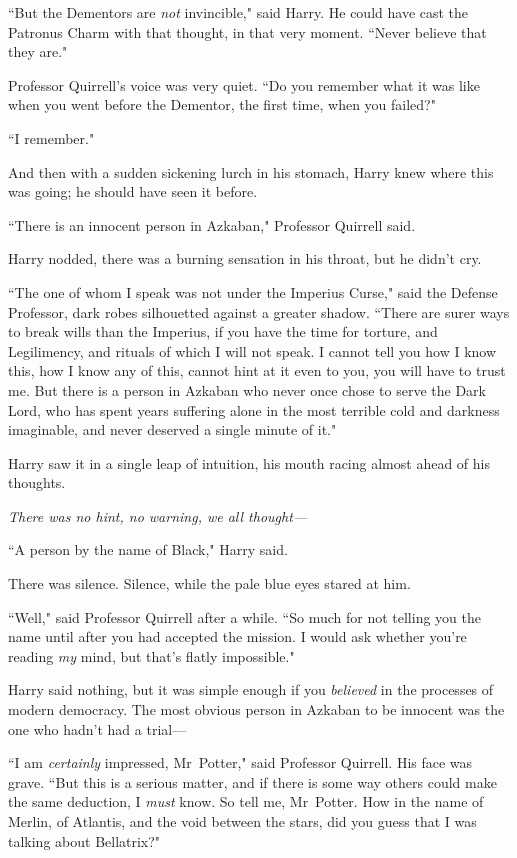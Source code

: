 ``But the Dementors are \emph{not} invincible," said Harry. He could have cast the Patronus Charm with that thought, in that very moment. ``Never believe that they are."

Professor Quirrell's voice was very quiet. ``Do you remember what it was like when you went before the Dementor, the first time, when you failed?"

``I remember."

And then with a sudden sickening lurch in his stomach, Harry knew where this was going; he should have seen it before.

``There is an innocent person in Azkaban," Professor Quirrell said.

Harry nodded, there was a burning sensation in his throat, but he didn't cry.

``The one of whom I speak was not under the Imperius Curse," said the Defense Professor, dark robes silhouetted against a greater shadow. ``There are surer ways to break wills than the Imperius, if you have the time for torture, and Legilimency, and rituals of which I will not speak. I cannot tell you how I know this, how I know any of this, cannot hint at it even to you, you will have to trust me. But there is a person in Azkaban who never once chose to serve the Dark Lord, who has spent years suffering alone in the most terrible cold and darkness imaginable, and never deserved a single minute of it."

Harry saw it in a single leap of intuition, his mouth racing almost ahead of his thoughts.

\emph{There was no hint, no warning, we all thought—}

``A person by the name of Black," Harry said.

There was silence. Silence, while the pale blue eyes stared at him.

``Well," said Professor Quirrell after a while. ``So much for not telling you the name until after you had accepted the mission. I would ask whether you're reading \emph{my} mind, but that's flatly impossible."

Harry said nothing, but it was simple enough if you \emph{believed} in the processes of modern democracy. The most obvious person in Azkaban to be innocent was the one who hadn't had a trial—

``I am \emph{certainly} impressed, Mr~Potter," said Professor Quirrell. His face was grave. ``But this is a serious matter, and if there is some way others could make the same deduction, I \emph{must} know. So tell me, Mr~Potter. How in the name of Merlin, of Atlantis, and the void between the stars, did you guess that I was talking about Bellatrix?"

